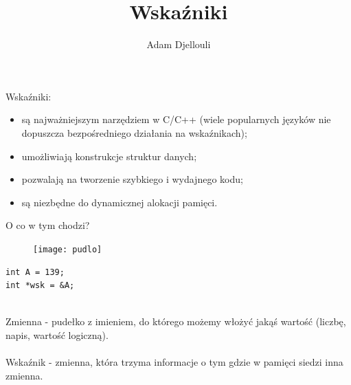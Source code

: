 \documentclass[notheorems, aspectratio=54]{beamer}
\title[Wskaźniki]{Wskaźniki}
\author{Adam Djellouli}
\begin{document}
\begin{frame}
	\titlepage
\end{frame}

\begin{frame}
	Wskaźniki:
	\begin{itemize}
		\item są najważniejszym narzędziem w C/C++ (wiele popularnych języków nie dopuszcza bezpośredniego działania na wskaźnikach);
		\item umożliwiają konstrukcje struktur danych;
		\item pozwalają na tworzenie szybkiego i wydajnego kodu;
		\item są niezbędne do dynamicznej alokacji pamięci.
	\end{itemize}
	
\end{frame}

\begin{frame}[fragile]
	O co w tym chodzi?
	\center
	\begin{table}[!htb]
		\begin{minipage}{.5\linewidth}
			\begin{figure}
				
				\texttt{[image: pudlo]}
			\end{figure}
		\end{minipage}%
		\begin{minipage}{.5\linewidth}
			
			\begin{lstlisting}
int A = 139;
int *wsk = &A;
			\end{lstlisting}
			~\\
			Zmienna - pudełko z imieniem, do którego możemy włożyć jakąś wartość (liczbę, napis, wartość logiczną).\\~\\
			Wskaźnik - zmienna, która trzyma informacje o tym gdzie w pamięci siedzi inna zmienna.
			
		\end{minipage} 
	\end{table}
	
\end{frame}
\end{document}
